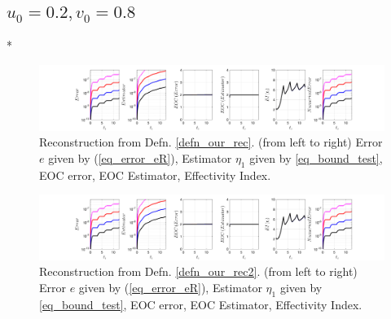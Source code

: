 \documentclass[12pt,a4paper]{article}
\numberwithin{equation}{section}
\theoremstyle{definition}
\begin{document}
\subsection*{$u_0=0.2, v_0= 0.8$}
\/*
\begin{figure}[H]
	\hspace{-3cm}
	\includegraphics[scale=0.55]{fig_LeapFrogplots_1x5_sin_IC_harmonic_order_2_u2_v8_rec_george}	
	\caption{Reconstruction from Defn. \ref{defn_our_rec}. (from left to right) Error $e$ given by (\ref{eq_error_eR}), Estimator $\eta_1$ given by \ref{eq_bound_test},  EOC error, EOC Estimator, Effectivity Index.}
	\label{fig_all_in_one_our_rec_george_u2_v8}
\end{figure}
\begin{figure}[H]
	\hspace{-3cm}
	\includegraphics[scale=0.55]{fig_LeapFrogplots_1x5_sin_IC_harmonic_order_2_u2_v8_rec2}	
	\caption{Reconstruction from Defn. \ref{defn_our_rec2}. (from left to right) Error $e$ given by (\ref{eq_error_eR}), Estimator $\eta_1$ given by \ref{eq_bound_test},   EOC error, EOC Estimator, Effectivity Index.}
	\label{fig_all_in_one_our_rec_2_u2_v8}
\end{figure}
\end{document}
